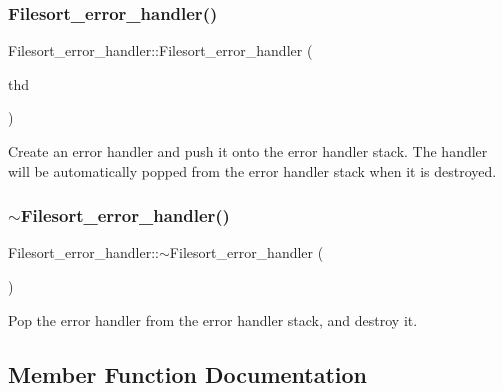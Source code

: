 \subsubsection{\texorpdfstring{Filesort\+\_\+error\+\_\+handler()}{Filesort\_error\_handler()}}
{\footnotesize\ttfamily Filesort\+\_\+error\+\_\+handler\+::\+Filesort\+\_\+error\+\_\+handler (\begin{DoxyParamCaption}\item[{T\+HD $\ast$}]{thd }\end{DoxyParamCaption})\hspace{0.3cm}{\ttfamily [inline]}}

Create an error handler and push it onto the error handler stack. The handler will be automatically popped from the error handler stack when it is destroyed. \mbox{\label{classFilesort__error__handler_a86798c9eff65bce3d17fc72f5f618f68}} 
\subsubsection{\texorpdfstring{$\sim$\+Filesort\+\_\+error\+\_\+handler()}{~Filesort\_error\_handler()}}
{\footnotesize\ttfamily Filesort\+\_\+error\+\_\+handler\+::$\sim$\+Filesort\+\_\+error\+\_\+handler (\begin{DoxyParamCaption}{ }\end{DoxyParamCaption})\hspace{0.3cm}{\ttfamily [inline]}}

Pop the error handler from the error handler stack, and destroy it. 

\subsection{Member Function Documentation}
\mbox{\label{classFilesort__error__handler_a5cf5379334399f6459b90b48caf9c6fe}} 
